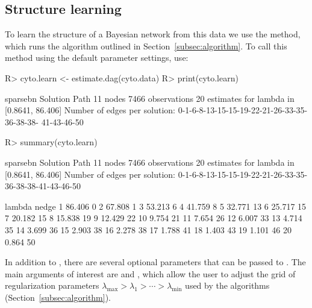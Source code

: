 \documentclass[article]{jss}
\renewcommand{\|}{\,|\,}
\begin{document}
\subsection{Structure learning}
\label{subsec:learning}

To learn the structure of a Bayesian network from this data we use the  method, which runs the algorithm outlined in Section~\ref{subsec:algorithm}. To call this method using the default parameter settings, use:
%
\begin{CodeChunk}
\begin{CodeInput}
R> cyto.learn <- estimate.dag(cyto.data)
R> print(cyto.learn)
\end{CodeInput}
\begin{CodeOutput}
sparsebn Solution Path
 11 nodes
 7466 observations
 20 estimates for lambda in [0.8641, 86.406]
 Number of edges per solution: 0-1-6-8-13-15-15-19-22-21-26-33-35-36-38-38-
 41-43-46-50
\end{CodeOutput}
\begin{CodeInput}
R> summary(cyto.learn)
\end{CodeInput}
\begin{CodeOutput}
sparsebn Solution Path
 11 nodes
 7466 observations
 20 estimates for lambda in [0.8641, 86.406]
 Number of edges per solution: 0-1-6-8-13-15-15-19-22-21-26-33-35-36-38-38-41-43-46-50

   lambda nedge
1  86.406     0
2  67.808     1
3  53.213     6
4  41.759     8
5  32.771    13
6  25.717    15
7  20.182    15
8  15.838    19
9  12.429    22
10  9.754    21
11  7.654    26
12  6.007    33
13  4.714    35
14  3.699    36
15  2.903    38
16  2.278    38
17  1.788    41
18  1.403    43
19  1.101    46
20  0.864    50
\end{CodeOutput}
\end{CodeChunk}
%
In addition to , there are several optional parameters that can be passed to . The main arguments of interest are  and , which allow the user to adjust the grid of regularization parameters $\lambda_{\max}>\lambda_{1}>\cdots>\lambda_{\min}$ used by the algorithms (Section~\ref{subsec:algorithm}). 
\end{document}
